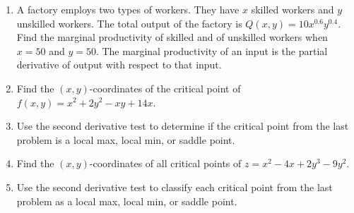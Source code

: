 \documentclass[10pt]{article}
\begin{document}
\begin{enumerate}

\item A factory employs two types of workers.  They have $x$ skilled workers and $y$ unskilled workers.  The total output of the factory is $Q(x,y) = 10x^{0.6} y^{0.4}$.  Find the marginal productivity of skilled and of unskilled workers when $x=50$ and $y=50$.  The marginal productivity of an input is the partial derivative of output with respect to that input.  
\vfill

\item Find the $(x,y)$-coordinates of the critical point of $f(x,y) = x^2 + 2y^2 - xy + 14x$.  
\vfill

\item Use the second derivative test to determine if the critical point from the last problem is a local max, local min, or saddle point.  
\vfill

\item Find the $(x,y)$-coordinates of all critical points of $z = x^2 - 4x + 2y^3 - 9y^2$. 
\vfill

\item Use the second derivative test to classify each critical point from the last problem as a local max, local min, or saddle point.  
\vfill

\end{enumerate}
\end{document}
